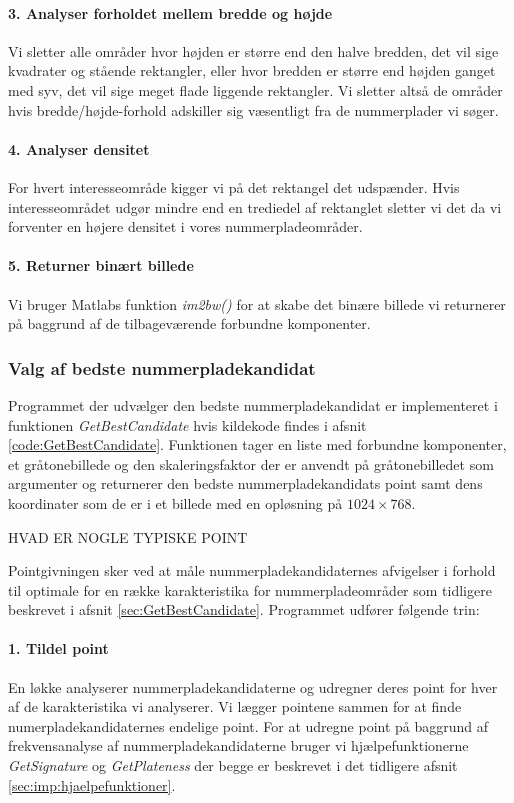 \paragraph{3. Analyser forholdet mellem bredde og højde}
Vi sletter alle områder hvor højden er større end den halve bredden, det vil sige kvadrater og stående rektangler, eller hvor bredden er større end højden ganget med syv, det vil sige meget flade liggende rektangler. Vi sletter altså de områder hvis bredde/højde-forhold adskiller sig væsentligt fra de nummerplader vi søger.

\paragraph{4. Analyser densitet}
For hvert interesseområde kigger vi på det rektangel det udspænder. Hvis interesseområdet udgør mindre end en trediedel af rektanglet sletter vi det da vi forventer en højere densitet i vores nummerpladeområder.

\paragraph{5. Returner binært billede}
Vi bruger Matlabs funktion \textit{im2bw()} for at skabe det binære billede vi returnerer på baggrund af de tilbageværende forbundne komponenter. 

\subsubsection{Valg af bedste nummerpladekandidat}
\label{sec:imp:GetBestCandidate}
Programmet der udvælger den bedste nummerpladekandidat er implementeret i funktionen \textit{GetBestCandidate} hvis kildekode findes i afsnit \vref{code:GetBestCandidate}. Funktionen tager en liste med forbundne komponenter, et gråtonebillede og den skaleringsfaktor der er anvendt på gråtonebilledet som argumenter og returnerer den bedste nummerpladekandidats point samt dens koordinater som de er i et billede med en opløsning på $1024 \times 768$. 

HVAD ER NOGLE TYPISKE POINT

Pointgivningen sker ved at måle nummerpladekandidaternes afvigelser i forhold til optimale for en række karakteristika for nummerpladeområder som tidligere beskrevet i afsnit \vref{sec:GetBestCandidate}.
Programmet udfører følgende trin:

\paragraph{1. Tildel point}
En løkke analyserer nummerpladekandidaterne og udregner deres point for hver af de karakteristika vi analyserer. Vi lægger pointene sammen for at finde numerpladekandidaternes endelige point. For at udregne point på baggrund af frekvensanalyse af nummerpladekandidaterne bruger vi hjælpefunktionerne \textit{GetSignature} og \textit{GetPlateness} der begge er beskrevet i det tidligere afsnit \vref{sec:imp:hjaelpefunktioner}. 

